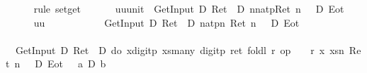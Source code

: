 \begin{isabellebody}
\ \ \ \ \isamarkupfalse%
\ {\isacharparenleft}rule\ set{\isacharunderscore}get{\isacharparenright}\isanewline
\ \ \isamarkupfalse%
\isanewline
\ \ \isamarkupfalse%
\ {\isachardoublequote}{\isasymforall}uu{\isacharcolon}{\isacharcolon}unit{\isachardot}\ {\isasymturnstile}\ GetInput\ {\isacharequal}\isactrlsub D\ Ret\ {\isacharbrackleft}{}{\isacharbrackright}\ {\isasymlongrightarrow}\isactrlsub D\ {\isasymlangle}n{\isasymleftarrow}natp{\isasymrangle}{\isacharparenleft}Ret\ {\isacharparenleft}n\ {\isacharequal}\ {}{\isacharparenright}\ {\isasymand}\isactrlsub D\ Eot{\isacharparenright}{\isachardoublequote}\isanewline
\ \ \isamarkupfalse%
\isanewline
\ \ \ \ \isamarkupfalse%
\ uu\isanewline
\ \ \ \ %
\isanewline
\ \ \ \ \isamarkupfalse%
\ {\isachardoublequote}{\isasymturnstile}\ GetInput\ {\isacharequal}\isactrlsub D\ Ret\ {\isacharbrackleft}{}{\isacharbrackright}\ {\isasymlongrightarrow}\isactrlsub D\ {\isasymlangle}natp{\isasymrangle}{\isacharparenleft}{\isasymlambda}n{\isachardot}\ Ret\ {\isacharparenleft}n\ {\isacharequal}\ {}{\isacharparenright}\ {\isasymand}\isactrlsub D\ Eot{\isacharparenright}{\isachardoublequote}\isanewline
\ \ \ \ \isamarkupfalse%
\ {\isacharminus}\isanewline
\ \ \ \ \ \ %
\isanewline
\ \ \ \ \ \ \isamarkupfalse%
\ {\isachardoublequote}{\isasymturnstile}\ GetInput\ {\isacharequal}\isactrlsub D\ Ret\ {\isacharbrackleft}{}{\isacharbrackright}\ {\isasymlongrightarrow}\isactrlsub D\ {\isasymlangle}do\ {\isacharbraceleft}x{\isasymleftarrow}digitp{\isacharsemicolon}\ xs{\isasymleftarrow}many\ digitp{\isacharsemicolon}\ ret\ {\isacharparenleft}foldl\ {\isacharparenleft}{\isasymlambda}r{\isachardot}\ op\ {\isacharplus}\ {\isacharparenleft}{}{}\ {\isacharasterisk}\ r{\isacharparenright}{\isacharparenright}\ x\ xs{\isacharparenright}{\isacharbraceright}{\isasymrangle}{\isacharparenleft}{\isasymlambda}n{\isachardot}\ Ret\ {\isacharparenleft}n\ {\isacharequal}\ {}{\isacharparenright}\ {\isasymand}\isactrlsub D\ Eot{\isacharparenright}{\isachardoublequote}\ {\isacharparenleft}\ {\isachardoublequote}{\isasymturnstile}\ {\isacharquery}a\ {\isasymlongrightarrow}\isactrlsub D\ {\isacharquery}b{\isachardoublequote}{\isacharparenright}\isanewline

\end{isabellebody}
